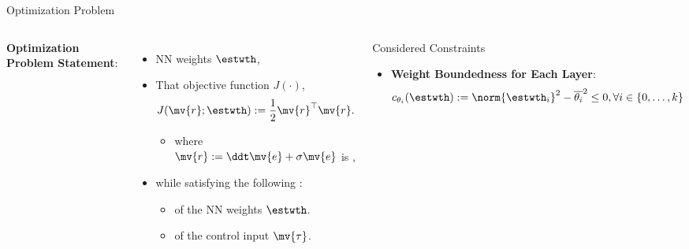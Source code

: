 \documentclass[8pt, aspectratio=169, handout]{beamer}
\newcommand{\ctxt}[2]{\color{#1}{#2}\color{black}}
\begin{document}
\begin{frame}{\insertsubsectionhead}{Optimization Problem}

\begin{columns}


    \textbf{Optimization Problem Statement}:

    \begin{itemize}
      \item \ctxt{awesome}{Find } NN weights $\estwth$,
      \item That \ctxt{airforceblue}{minimize } objective function $J(\cdot)$,
        \begin{equation}\label{eq:obj}
          J(\mv{r};\estwth)
          := 
          \frac{1}{2} \mv{r}^\top \mv{r}.
        \end{equation}
        \begin{itemize}
          \item where $\mv{r} := \ddt\mv{e} + \sigma\mv{e}$ is \ctxt{awesome}{filtered tracking error},
        \end{itemize}
      \item while satisfying the following \ctxt{awesome}{constraints}:
        \begin{itemize}
          \item \ctxt{airforceblue}{Boundedness } of the NN weights $\estwth$.
          \item \ctxt{airforceblue}{Saturation } of the control input $\mv{\tau}$.
        \end{itemize}
    \end{itemize}

  

  {
    \begin{block}{Considered Constraints}

      \begin{itemize}
        \item \textbf{Weight Boundedness for Each Layer}: 
          \begin{equation}\label{eq:cstr:weight}
            c_{\theta_i}(\estwth)
            :=
            \norm{\estwth_i}^2 - \overline{\theta_i}^2 \le 0
            , 
            \forall i\in\{0,\ldots,k\}
          \end{equation}


\end{itemize}
\end{block}}
\end{columns}
\end{frame}
\end{document}
